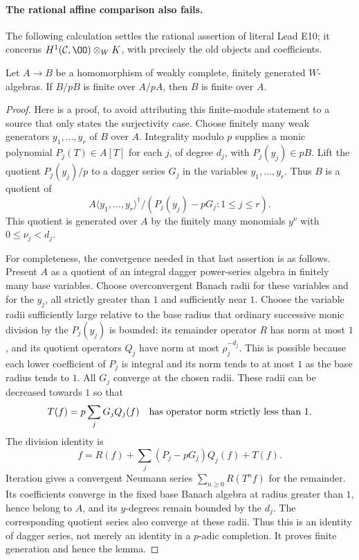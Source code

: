 \paragraph{The rational affine comparison also fails.}
The following calculation settles the rational assertion of literal Lead E10; it concerns $H^1(\mathcal C,\OO)\otimes_WK$, with precisely the old objects and coefficients.

\begin{lemma}\label{lem:DE-weak-finite}
Let $A\to B$ be a homomorphism of weakly complete, finitely generated $W$-algebras.  If $B/pB$ is finite over $A/pA$, then $B$ is finite over $A$.
\end{lemma}
\begin{proof}
Here is a proof, to avoid attributing this finite-module statement to a source that only states the surjectivity case.  Choose finitely many weak generators $y_1,\ldots,y_r$ of $B$ over $A$.  Integrality modulo $p$ supplies a monic polynomial $P_j(T)\in A[T]$ for each $j$, of degree $d_j$, with $P_j(y_j)\in pB$.  Lift the quotient $P_j(y_j)/p$ to a dagger series $G_j$ in the variables $y_1,\ldots,y_r$.  Thus $B$ is a quotient of
\[
 A\langle y_1,\ldots,y_r\rangle^\dagger/
       (P_j(y_j)-pG_j:1\leq j\leq r).
\]
This quotient is generated over $A$ by the finitely many monomials $y^\nu$ with $0\leq\nu_j<d_j$.

For completeness, the convergence needed in that last assertion is as follows.  Present $A$ as a quotient of an integral dagger power-series algebra in finitely many base variables.  Choose overconvergent Banach radii for these variables and for the $y_j$, all strictly greater than $1$ and sufficiently near $1$.  Choose the variable radii sufficiently large relative to the base radius that ordinary successive monic division by the $P_j(y_j)$ is bounded: its remainder operator $R$ has norm at most $1$, and its quotient operators $Q_j$ have norm at most $\rho_j^{-d_j}$.  This is possible because each lower coefficient of $P_j$ is integral and its norm tends to at most $1$ as the base radius tends to $1$.  All $G_j$ converge at the chosen radii.  These radii can be decreased towards $1$ so that
\[
             T(f)=p\sum_jG_jQ_j(f)
             \quad\hbox{has operator norm strictly less than }1.
\]
The division identity is
\[
 f=R(f)+\sum_j(P_j-pG_j)Q_j(f)+T(f).
\]
Iteration gives a convergent Neumann series $\sum_{n\geq0}R(T^nf)$ for the remainder.  Its coefficients converge in the fixed base Banach algebra at radius greater than $1$, hence belong to $A$, and its $y$-degrees remain bounded by the $d_j$.  The corresponding quotient series also converge at these radii.  Thus this is an identity of dagger series, not merely an identity in a $p$-adic completion.  It proves finite generation and hence the lemma.
\end{proof}

